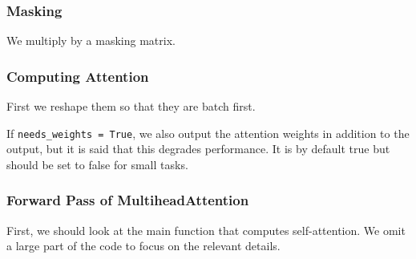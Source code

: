   \subsubsection{Masking} 

    We multiply by a masking matrix. 

  \subsubsection{Computing Attention}

    First we reshape them so that they are batch first. 

    If \texttt{needs\_weights = True}, we also output the attention weights in addition to the output, but it is said that this degrades performance. It is by default true but should be set to false for small tasks. 

  \subsubsection{Forward Pass of MultiheadAttention}

    First, we should look at the main function that computes self-attention. We omit a large part of the code to focus on the relevant details. 

